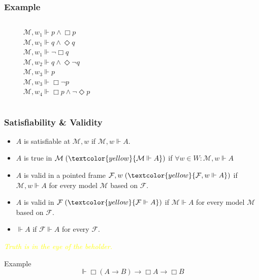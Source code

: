 \documentclass[UTF8,11pt,colorlinks,compress,openany]{beamer}%
\begin{document}
\begin{frame}\frametitle{Example}
	\begin{columns}
\begin{center}
\end{center}
			\begin{align*}
			&\mathcal{M},w_1\Vdash p\wedge\Box p\\
			&\mathcal{M},w_1\Vdash q\wedge\Diamond q\\
			&\mathcal{M},w_1\Vdash\neg\Box q\\
			&\mathcal{M},w_2\Vdash q\wedge\Diamond\neg q\\
			&\mathcal{M},w_3\Vdash p\\
			&\mathcal{M},w_3\Vdash\Box\neg p\\
			&\mathcal{M},w_4\Vdash\Box p\wedge\neg\Diamond p
			\end{align*}
	\end{columns}
\end{frame}

\begin{frame}\frametitle{Satisfiability \& Validity}
	\begin{itemize}
		\item $A$ is satisfiable at $\mathcal{M},w$ if $\mathcal{M},w\Vdash A$.
		\item $A$ is true in $\mathcal{M}\;(\textcolor{yellow}{\mathcal{M}\Vdash A})$ if $\forall w\in W: \mathcal{M},w\Vdash A$
		\item $A$ is valid in a pointed frame $\mathcal{F},w\;(\textcolor{yellow}{\mathcal{F},w\Vdash A})$ if $\mathcal{M},w\Vdash A$ for every model $\mathcal{M}$ based on $\mathcal{F}$.
		\item $A$ is valid in $\mathcal{F}\;(\textcolor{yellow}{\mathcal{F}\Vdash A})$ if $\mathcal{M}\Vdash A$ for every model $\mathcal{M}$ based on $\mathcal{F}$.
		\item $\Vdash A$ if $\mathcal{F}\Vdash A$ for every $\mathcal{F}$.
	\end{itemize}
\centering\textcolor{yellow}{\emph{Truth is in the eye of the beholder.}}
\setlength\abovedisplayskip{0pt}
	\begin{block}{Example}
		\[\Vdash\Box(A\to B)\to\Box A\to\Box B\]
	\end{block}
\end{frame}
\end{document}
